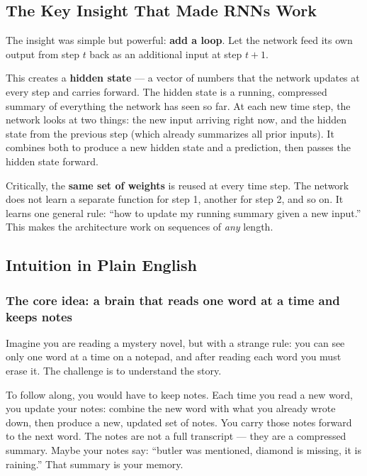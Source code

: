 \subsection{The Key Insight That Made RNNs Work}

The insight was simple but powerful: \textbf{add a loop}. Let the network feed its own
output from step $t$ back as an additional input at step $t{+}1$.

This creates a \textbf{hidden state} --- a vector of numbers that the network updates at
every step and carries forward. The hidden state is a running, compressed summary of
everything the network has seen so far. At each new time step, the network looks at two
things: the new input arriving right now, and the hidden state from the previous step
(which already summarizes all prior inputs). It combines both to produce a new hidden
state and a prediction, then passes the hidden state forward.

Critically, the \textbf{same set of weights} is reused at every time step. The network
does not learn a separate function for step 1, another for step 2, and so on. It learns
one general rule: ``how to update my running summary given a new input.'' This makes the
architecture work on sequences of \textit{any} length.

\subsection{Intuition in Plain English}

\subsubsection{The core idea: a brain that reads one word at a time and keeps notes}

Imagine you are reading a mystery novel, but with a strange rule: you can see only
one word at a time on a notepad, and after reading each word you must erase it. The
challenge is to understand the story.

To follow along, you would have to keep notes. Each time you read a new word, you
update your notes: combine the new word with what you already wrote down, then produce
a new, updated set of notes. You carry those notes forward to the next word. The notes
are not a full transcript --- they are a compressed summary. Maybe your notes say:
``butler was mentioned, diamond is missing, it is raining.'' That summary is your
memory.

